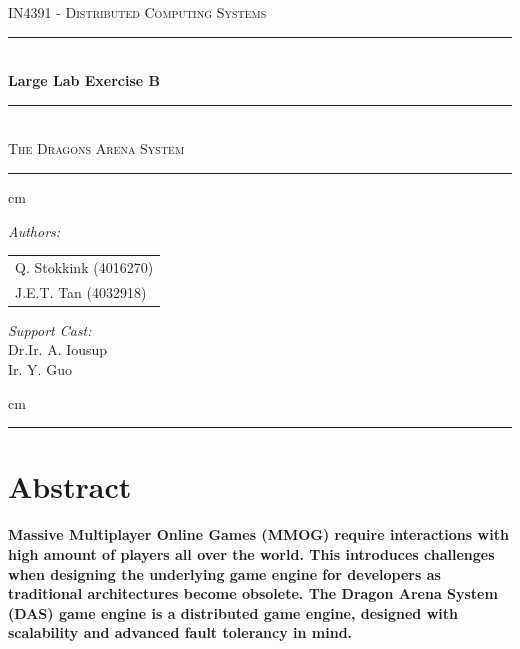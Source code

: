 \documentclass[a4paper,10pt]{article}
\begin{document}
\begin{titlepage}
			\begin{center}
			\textsc{\LARGE {IN4391 - Distributed Computing Systems}}\\[1cm]
			\rule{\linewidth}{0.5mm} \\[0.4cm]

			{\Huge \bfseries Large Lab Exercise B}\\[0.15cm]

			\rule{\linewidth}{0.5mm} \\
			\textsc{\large{The Dragons Arena System}}
			
				\rule{\linewidth}{0.5mm}
			
			 cm
			
			\begin{minipage}{0.4\textwidth}
				\begin{flushleft} \large
					\emph{Authors:}\\
					\begin{tabular}{l}
						Q. Stokkink (4016270) \\
						J.E.T. Tan (4032918)\\
					\end{tabular}
				\end{flushleft}
			\end{minipage}
			\hspace{1cm}
			\begin{minipage}{0.4\textwidth}
				\begin{flushright} \large
					\emph{Support Cast:} \\
					Dr.Ir. A. Iousup \\
					Ir. Y. Guo
				\end{flushright}
			\end{minipage}
			
			 cm
			
			\rule{\linewidth}{0.5mm}
			\end{center}
\end{titlepage}

\section{Abstract}
\label{sec:abstract}

\textbf{Massive Multiplayer Online Games (MMOG) require interactions with high amount of players all over the world.
This introduces challenges when designing the underlying game engine for developers as traditional architectures become obsolete.
The Dragon Arena System (DAS) game engine is a distributed game engine, designed with scalability and advanced fault tolerancy in mind.}
\end{document}

